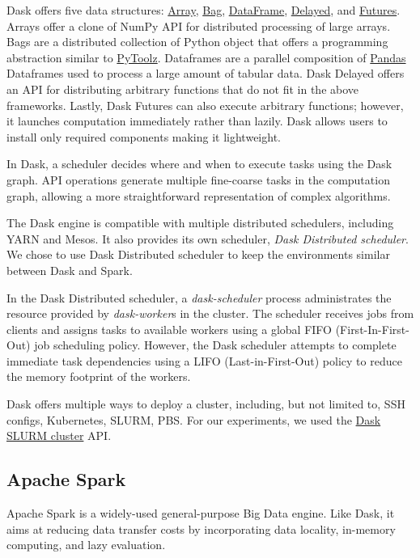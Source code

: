 \documentclass[AMA,STIX1COL]{WileyNJD-v2}
\begin{document}
Dask offers five data structures:
\href{https://docs.dask.org/en/latest/array.html}{Array},
\href{https://docs.dask.org/en/latest/bag.html}{Bag},
\href{https://docs.dask.org/en/latest/dataframe.html}{DataFrame},
\href{https://docs.dask.org/en/latest/delayed.html}{Delayed},
and \href{https://docs.dask.org/en/latest/futures.html}{Futures}.
Arrays offer a clone of NumPy API for distributed processing of large arrays.
Bags are a distributed collection of Python object that offers a programming abstraction similar to \href{https://toolz.readthedocs.io/en/latest/}{PyToolz}.
Dataframes are a parallel composition of \href{https://pandas.pydata.org/}{Pandas} Dataframes used to process a large amount of tabular data.
Dask Delayed offers an API for distributing arbitrary functions that do not fit in the above frameworks.
Lastly, Dask Futures can also execute arbitrary functions; however, it launches computation immediately rather than lazily.
Dask allows users to install only required components making it lightweight.
		
In Dask, a scheduler decides where and when to execute tasks using the Dask graph.
API operations generate multiple fine-coarse tasks in the computation graph, allowing a more straightforward representation of complex algorithms.
		
The Dask engine is compatible with multiple distributed schedulers, including YARN and Mesos.
It also provides its own scheduler, \textit{Dask Distributed scheduler}.
We chose to use Dask Distributed scheduler to keep the environments similar between Dask and Spark.
		
In the Dask Distributed scheduler, a \textit{dask-scheduler} process administrates the resource provided by \textit{dask-worker}s in the cluster.
The scheduler receives jobs from clients and assigns tasks to available workers using a global FIFO (First-In-First-Out) job scheduling policy.
However, the Dask scheduler attempts to complete immediate task dependencies using a LIFO (Last-in-First-Out) policy to reduce the memory footprint of the workers.
		
Dask offers multiple ways to deploy a cluster, including, but not limited to, SSH configs, Kubernetes, SLURM, PBS.
For our experiments, we used the \href{https://jobqueue.dask.org/en/latest/generated/dask_jobqueue.SLURMCluster.html}{Dask SLURM cluster} API.
		
\subsection{Apache Spark}
Apache Spark is a widely-used general-purpose Big Data engine.
Like Dask, it aims at reducing data transfer costs by incorporating data locality, in-memory computing, and lazy evaluation.
		
\end{document}
